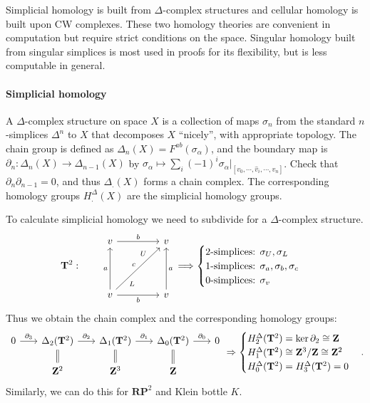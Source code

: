 \documentclass[11pt]{article}
\theoremstyle{definition}
\theoremstyle{plain}
\newcommand{\Z}{\mathbf{Z}}
\newcommand{\1}{\mathbf{1}}
\begin{document}
Simplicial homology is built from $\Delta$-complex structures and cellular homology is built upon CW complexes. These two homology theories are convenient in computation but require strict conditions on the space. Singular homology built from singular simplices is most used in proofs for its flexibility, but is less computable in general. 

\paragraph{Simplicial homology}

A $\Delta$-complex structure on space $X$ is a collection of maps $\sigma_n$ from the standard $n$-simplices $\Delta^n$ to $X$ that decomposes $X$ ``nicely'', with appropriate topology. The chain group is defined as $\Delta_n(X)=F^{ab}(\sigma_\alpha)$, and the boundary map is $\partial_n:\Delta_n(X)\to\Delta_{n-1}(X)$ by $\sigma_\alpha\mapsto\sum_i(-1)^i\sigma_\alpha|_{[v_0,\cdots,\hat{v}_i,\cdots,v_n]}$. Check that $\partial_n\partial_{n-1}=0$, and thus $\Delta_.(X)$ forms a chain complex. The corresponding homology groups $H_.^\Delta(X)$ are the simplicial homology groups.\medbreak

To calculate simplicial homology we need to subdivide for a $\Delta$-complex structure.
\[\mathbf{T}^2:\quad\quad\begin{tikzcd}[column sep=1.5cm,row sep=1.5cm]
v\arrow{r}{b}&v\\
v\arrow{u}{a}\arrow[swap]{r}{b}\arrow[ur,"U" near end,"L"' near start,"c"]&v\arrow[swap]{u}{a}
\end{tikzcd}\Longrightarrow\begin{cases}
\textrm{2-simplices: }\sigma_U,\sigma_L\\
\textrm{1-simplices: }\sigma_a,\sigma_b,\sigma_c\\
\textrm{0-simplices: }\sigma_v
\end{cases}\]
Thus we obtain the chain complex and the corresponding homology groups:
\[\begin{tikzcd}[column sep=scriptsize,row sep=scriptsize]
0\arrow{r}{\partial_3}&\Delta_2(\mathbf{T}^2)\arrow[equal]{d}\arrow{r}{\partial_2}&\Delta_1(\mathbf{T}^2)\arrow[equal]{d}\arrow{r}{\partial_1}&\Delta_0(\mathbf{T}^2)\arrow{r}{\partial_0}\arrow[equal]{d}&0\\
&\Z^2&\Z^3&\Z
\end{tikzcd}\Rightarrow\begin{cases}H_2^\Delta(\mathbf{T}^2)=\ker\partial_2\cong\Z\\
H_1^\Delta(\mathbf{T}^2)\cong\Z^3/\Z\cong\Z^2\\
H_0^\Delta(\mathbf{T}^2)=H_3^\Delta(\mathbf{T}^2)=0
\end{cases}.\]
Similarly, we can do this for $\mathbf{RP}^2$ and Klein bottle $K$.
\end{document}
